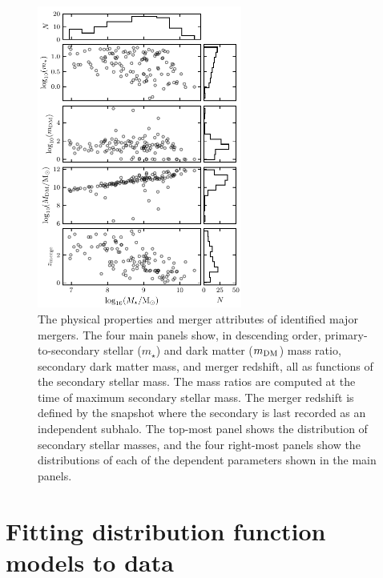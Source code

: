 \begin{figure}
    \centering
    \includegraphics[width=0.6\textwidth]{figure/ch4/merger_params.pdf}
    \caption{The physical properties and merger attributes of identified major mergers. The four main panels show, in descending order, primary-to-secondary stellar ($m_{\star}$) and dark matter ($m_{\rm DM}$) mass ratio, secondary dark matter mass, and merger redshift, all as functions of the secondary stellar mass. The mass ratios are computed at the time of maximum secondary stellar mass. The merger redshift is defined by the snapshot where the secondary is last recorded as an independent subhalo. The top-most panel shows the distribution of secondary stellar masses, and the four right-most panels show the distributions of each of the dependent parameters shown in the main panels.}
    \label{ch4:fig:merger-params}
\end{figure}

\section{Fitting distribution function models to data}
\label{ch4:sec:fitting-distribution-functions}

